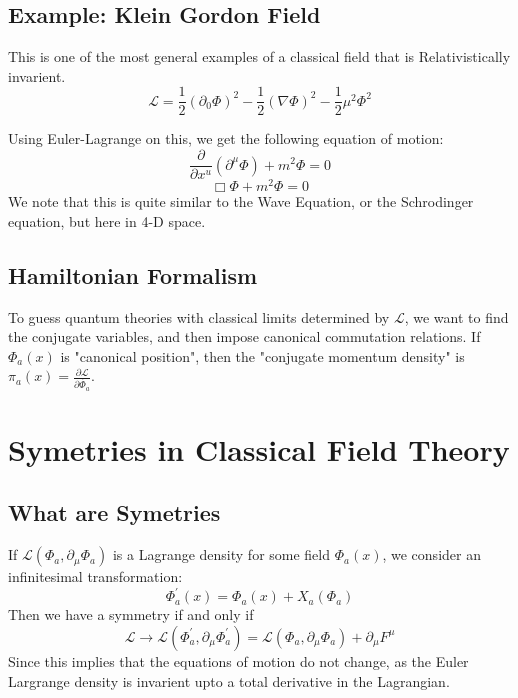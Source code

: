 \subsection{Example: Klein Gordon Field}

This is one of the most general examples of a classical field that is Relativistically invarient.
\begin{equation}
  \mathcal{L} = \frac{1}{2} (\partial_0 \Phi)^2 - \frac{1}{2} (\nabla \Phi)^2 - \frac{1}{2} \mu^2 \Phi^2
\end{equation}

Using Euler-Lagrange on this, we get the following equation of motion:
\begin{equation*}
  \frac{\partial}{\partial x^u} (\partial^\mu \Phi) + m^2 \Phi = 0
\end{equation*}
\begin{equation}
  \Box \Phi + m^2 \Phi = 0
\end{equation}
We note that this is quite similar to the Wave Equation, or the Schrodinger equation, but here in 4-D space.


\subsection{Hamiltonian Formalism}

To guess quantum theories with classical limits determined by $\mathcal{L}$, we want to find the conjugate variables, and then impose canonical commutation relations.
If $\Phi_a(x)$ is "canonical position", then the "conjugate momentum density" is $\pi_a(x) = \frac{\partial \mathcal{L}}{\partial \dot{\Phi_a}}$.



\section{Symetries in Classical Field Theory}


\subsection{What are Symetries}
If $\mathcal{L}(\Phi_a, \partial_\mu \Phi_a)$ is a Lagrange density for some field $\Phi_a(x)$, we consider an infinitesimal transformation:
\begin{equation}
  \Phi_a^\prime(x) = \Phi_a(x) + X_a(\Phi_a)
\end{equation}
Then we have a symmetry if and only if
\begin{equation}
  \mathcal{L} \longrightarrow \mathcal{L}(\Phi_a^\prime, \partial_\mu \Phi_a^\prime) = \mathcal{L}(\Phi_a, \partial_\mu \Phi_a) + \partial_\mu F^\mu
\end{equation}
Since this implies that the equations of motion do not change, as the Euler Largrange density is invarient upto a total derivative in the Lagrangian.

